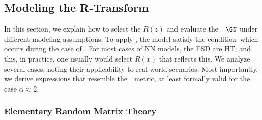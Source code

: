\subsection{Modeling the R-Transform}
\label{sxn:r_transforms}


In this section, we explain how to select the \RTransform $R(z)$ and evaluate the~\GEN~$\GN$ under different modeling assumptions.
To apply \SETOL, the model satisfy the \TRACELOG condition--which occurs during the case of  \IdealLearning.
For most cases of NN models, the ESD are HT; and this, in practice, one usually would select $R(x)$ that reflects this. 
We analyze several cases, noting their applicability to real-world scenarios.
Most importantly,  we derive expressions that resemble the~\WW~\ALPHAHAT metric, at least formally valid
for the case $\alpha\approx 2$.


\subsubsection{Elementary Random Matrix Theory}
\label{sxn:r_transforms:elementary_rmt}

